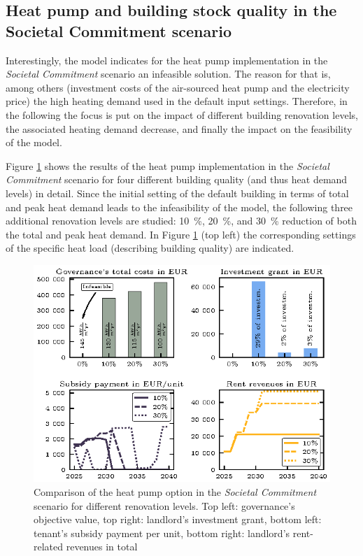 \subsection{Heat pump and building stock quality in the Societal Commitment scenario}\label{res:heat_pump}
Interestingly, the model indicates for the heat pump implementation in the \textit{Societal Commitment} scenario an infeasible solution. The reason for that is, among others (investment costs of the air-sourced heat pump and the electricity price) the high heating demand used in the default input settings. Therefore, in the following the focus is put on the impact of different building renovation levels, the associated heating demand decrease, and finally the impact on the feasibility of the model.\vspace{0.5cm} 

Figure \ref{fig:retrofitting} shows the results of the heat pump implementation in the \textit{Societal Commitment} scenario for four different building quality (and thus heat demand levels) in detail. Since the initial setting of the default building in terms of total and peak heat demand leads to the infeasibility of the model, the following three additional renovation levels are studied: \SI{10}{\%}, \SI{20}{\%}, and \SI{30}{\%} reduction of both the total and peak heat demand. In Figure \ref{fig:retrofitting} (top left) the corresponding settings of the specific heat load (describing building quality) are indicated.

\begin{figure}[h]
	\centering
	\includegraphics[width=0.9\linewidth]{figures/4_Results/fig_retrofitting/retrofitting.eps}
	\caption{Comparison of the heat pump option in the \textit{Societal Commitment} scenario for different renovation levels. Top left: governance's objective value, top right: landlord's investment grant, bottom left: tenant's subsidy payment per unit, bottom right: landlord's rent-related revenues in total}
	\label{fig:retrofitting}
\end{figure}

